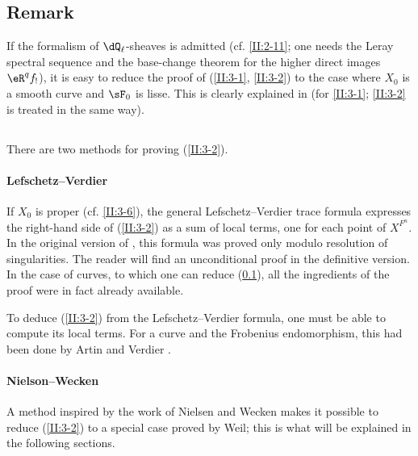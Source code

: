 \subsection{Remark}\label{II:3-7}

If the formalism of $\dQ_\ell$-sheaves is admitted (cf. \ref{II:2-11}; one
needs the Leray spectral sequence and the base-change theorem for the higher
direct images $\eR^q f_!$), it is easy to reduce the proof of
(\ref{II:3-1}, \ref{II:3-2}) to the case where $X_0$ is a smooth curve and
$\sF_0$ is lisse. This is clearly explained in \cite[\S 5]{gr95} (for
\ref{II:3-1}; \ref{II:3-2} is treated in the same way).






\subsection{}\label{II:3-8}

There are two methods for proving (\ref{II:3-2}).



\paragraph{Lefschetz--Verdier}
If $X_0$ is proper (cf. \ref{II:3-6}), the general Lefschetz--Verdier trace
formula expresses the right-hand side of (\ref{II:3-2}) as a sum of local
terms, one for each point of $X^{F^n}$. In the original version of
\cite{sga5}, this formula was proved only modulo resolution of singularities.
The reader will find an unconditional proof in the definitive version. In
the case of curves, to which one can reduce (\ref{II:3-7}), all the
ingredients of the proof were in fact already available.

To deduce (\ref{II:3-2}) from the Lefschetz--Verdier formula, one must be
able to compute its local terms. For a curve and the Frobenius endomorphism,
this had been done by Artin and Verdier \cite{ve67}.



\paragraph{Nielson--Wecken}
A method inspired by the work of Nielsen and Wecken makes it possible to
reduce (\ref{II:3-2}) to a special case proved by Weil; this is what will be
explained in the following sections.











